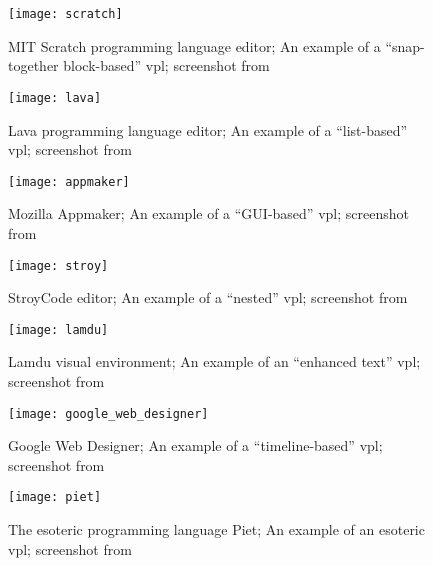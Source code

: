 \begin{figure}[h!]
    \centering \texttt{[image: scratch]}
    \caption{
        MIT Scratch programming language editor;
        An example of a ``snap-together block-based'' \acrshort{vpl};
        screenshot from \protect\cite{fig_scratch}
    }
    \label{fig:scratch}
\end{figure}

\begin{figure}[h!]
    \centering \texttt{[image: lava]}
    \caption{
        Lava programming language editor;
        An example of a ``list-based'' \acrshort{vpl};
        screenshot from \protect\cite{fig_lava}
    }
    \label{fig:lava}
\end{figure}

\begin{figure}[h!]
    \centering \texttt{[image: appmaker]}
    \caption{
        Mozilla Appmaker;
        An example of a ``GUI-based'' \acrshort{vpl};
        screenshot from \protect\cite{fig_appmaker}
    }
    \label{fig:appmaker}
\end{figure}

\begin{figure}[h!]
    \centering \texttt{[image: stroy]}
    \caption{
        StroyCode editor;
        An example of a ``nested'' \acrshort{vpl};
        screenshot from \protect\cite{fig_stroy}
    }
    \label{fig:stroy}
\end{figure}

\begin{figure}[h!]
    \centering \texttt{[image: lamdu]}
    \caption{
        Lamdu visual environment;
        An example of an ``enhanced text'' \acrshort{vpl};
        screenshot from \protect\cite{fig_lamdu}
    }
    \label{fig:lamdu}
\end{figure}

\begin{figure}[h!]
    \centering \texttt{[image: google\_web\_designer]}
    \caption{
        Google Web Designer;
        An example of a ``timeline-based'' \acrshort{vpl};
        screenshot from \protect\cite{fig_google_web_designer}
    }
    \label{fig:google_web_designer}
\end{figure}

\begin{figure}[h!]
    \centering \texttt{[image: piet]}
    \caption{
        The esoteric programming language Piet;
        An example of an esoteric \acrshort{vpl};
        screenshot from \protect\cite{fig_piet}
    }
    \label{fig:piet}
\end{figure}

